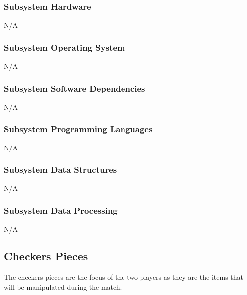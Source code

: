 \subsubsection{Subsystem Hardware}
N/A

\subsubsection{Subsystem Operating System}
N/A

\subsubsection{Subsystem Software Dependencies}
N/A

\subsubsection{Subsystem Programming Languages}
N/A

\subsubsection{Subsystem Data Structures}
N/A

\subsubsection{Subsystem Data Processing}
N/A

\subsection{Checkers Pieces}
The checkers pieces are the focus of the two players as they are the items that will be manipulated during the match. 

